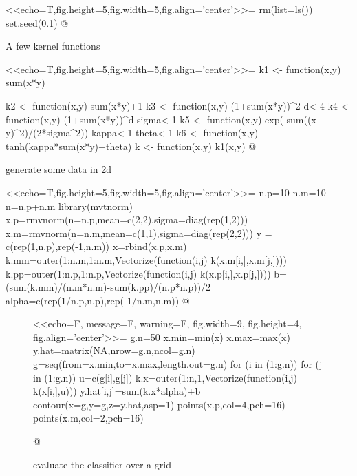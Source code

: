 \documentclass[12pt]{article}
\begin{document}
<<echo=T,fig.height=5,fig.width=5,fig.align='center'>>=
rm(list=ls())
set.seed(0.1)
@

A few kernel functions

<<echo=T,fig.height=5,fig.width=5,fig.align='center'>>=
k1 <- function(x,y){
  sum(x*y)}

k2 <- function(x,y){
  sum(x*y)+1}
k3 <- function(x,y){
  (1+sum(x*y))^2}
d<-4
k4 <- function(x,y){
  (1+sum(x*y))^d}
sigma<-1
k5 <- function(x,y){
 exp(-sum((x-y)^2)/(2*sigma^2))}
kappa<-1
theta<-1
k6 <- function(x,y){
  tanh(kappa*sum(x*y)+theta)}
k <- function(x,y){
  k1(x,y)}
@

 generate some data in 2d

<<echo=T,fig.height=5,fig.width=5,fig.align='center'>>=
n.p=10
n.m=10
n=n.p+n.m
library(mvtnorm)
x.p=rmvnorm(n=n.p,mean=c(2,2),sigma=diag(rep(1,2)))
x.m=rmvnorm(n=n.m,mean=c(1,1),sigma=diag(rep(2,2)))
y = c(rep(1,n.p),rep(-1,n.m))
x=rbind(x.p,x.m)
k.mm=outer(1:n.m,1:n.m,Vectorize(function(i,j) k(x.m[i,],x.m[j,])))
k.pp=outer(1:n.p,1:n.p,Vectorize(function(i,j) k(x.p[i,],x.p[j,])))
b=(sum(k.mm)/(n.m*n.m)-sum(k.pp)/(n.p*n.p))/2
alpha=c(rep(1/n.p,n.p),rep(-1/n.m,n.m))
@


\begin{figure}[h]
<<echo=F, message=F, warning=F, fig.width=9, fig.height=4, fig.align='center'>>=
g.n=50
x.min=min(x)
x.max=max(x)
y.hat=matrix(NA,nrow=g.n,ncol=g.n)
g=seq(from=x.min,to=x.max,length.out=g.n)
for (i in (1:g.n)){
  for (j in (1:g.n)){
    u=c(g[i],g[j])
    k.x=outer(1:n,1,Vectorize(function(i,j) k(x[i,],u)))
    y.hat[i,j]=sum(k.x*alpha)+b
  }
}
contour(x=g,y=g,z=y.hat,asp=1)
points(x.p,col=4,pch=16)
points(x.m,col=2,pch=16)

@
\caption{evaluate the classifier over a grid }
\label{fig:classifier}
\end{figure}
\end{document}

